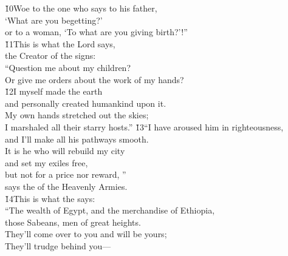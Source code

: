 \begin{poetry}
\poeml \v{10}Woe to the one who says to his father, \\
\poemll    `What are you begetting?' \\
\poemlll       or to a woman, `To what are you giving birth?'!'' \\
\poeml \v{11}This is what the Lord says, \\
\poemll    the Creator of the signs: \\
\poeml ``Question me about my children? \\
\poemll    Or give me orders about the work of my hands? \\
\poeml \v{12}I myself made the earth \\
\poemll    and personally created humankind upon it. \\
\poeml My own hands stretched out the skies; \\
\poemll    I marshaled all their starry hosts.''
\poeml \v{13}``I have aroused him in righteousness, \\
\poemll    and I'll make all his pathways smooth. \\
\poeml It is he who will rebuild my city \\
\poemll    and set my exiles free, \\
\poeml but not for a price nor reward, '' \\
\poemll    says the  of the Heavenly Armies. \\
\poeml \v{14}This is what the  says: \\
\poeml ``The wealth of Egypt, and the merchandise of Ethiopia, \\
\poemll    those Sabeans, men of great heights. \\
\poeml They'll come over to you and will be yours; \\
\poemll    They'll trudge behind you--- \\

\end{poetry}
